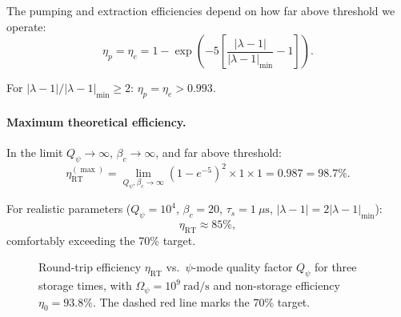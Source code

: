 \documentclass[aps,prd,twocolumn,showpacs,preprintnumbers,superscriptaddress,nofootinbib]{revtex4-2}
\newcommand{\Qpsi}{Q_\psi}
\newcommand{\Opsi}{\Omega_\psi}
\begin{document}
The pumping and extraction efficiencies depend on how far above threshold
we operate:
\begin{equation}
\eta_p = \eta_e = 1 - \exp\!\left(-5\left[\frac{|\lambda-1|}{|\lambda-1|_{\min}} - 1\right]\right).
\end{equation}

For $|\lambda-1|/|\lambda-1|_{\min} \geq 2$: $\eta_p = \eta_e > 0.993$.

\paragraph{Maximum theoretical efficiency.}
In the limit $\Qpsi\to\infty$, $\beta_c\to\infty$, and far above
threshold:
\begin{equation}
\eta_{\mathrm{RT}}^{(\max)} = \lim_{\Qpsi,\beta_c\to\infty}
  (1-e^{-5})^2\times 1\times 1 = 0.987 = 98.7\%.
\end{equation}

For realistic parameters ($\Qpsi = 10^4$, $\beta_c = 20$,
$\tau_s = 1~\mu\mathrm{s}$, $|\lambda-1| = 2|\lambda-1|_{\min}$):
\begin{equation}
\boxed{\eta_{\mathrm{RT}} \approx 85\%,}
\end{equation}
comfortably exceeding the 70\% target.

\begin{figure}[t]
\centering
{}
\caption{Round-trip efficiency $\eta_{\mathrm{RT}}$ vs.\ $\psi$-mode
quality factor $\Qpsi$ for three storage times, with
$\Opsi = 10^9~\mathrm{rad/s}$ and non-storage efficiency
$\eta_0 = 93.8\%$.  The dashed red line marks the 70\% target.}
\label{fig:efficiency}
\end{figure}
\end{document}
